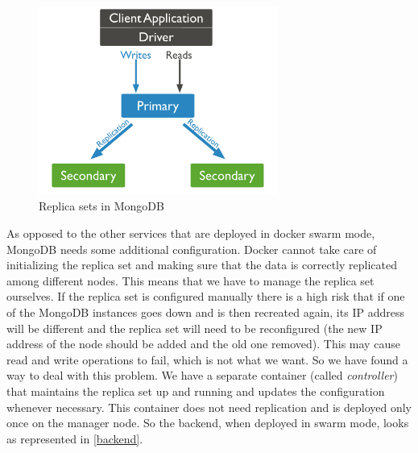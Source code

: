     \begin{figure}[H]
		\centering
		\includegraphics[width=0.7\textwidth]{images/replication.png}
		\caption{Replica sets in MongoDB}
		\label{repl}
	\end{figure}


As opposed to the other services that are deployed in docker swarm mode, MongoDB needs some additional configuration. Docker cannot take care of initializing the replica set and making sure that the data is correctly replicated among different nodes. This means that we have to manage the replica set ourselves. If the replica set is configured manually there is a high risk that if one of the MongoDB instances goes down and is then recreated again, its IP address will be different and the replica set will need to be reconfigured (the new IP address of the node should be added and the old one removed). This may cause read and write operations to fail, which is not what we want. So we have found a way to deal with this problem. We have a separate container (called \textit{controller}) that maintains the replica set up and running and updates the configuration whenever necessary.  This container does not need replication and is deployed only once on the manager node. So the backend, when deployed in swarm mode, looks as represented in \autoref{backend}.

